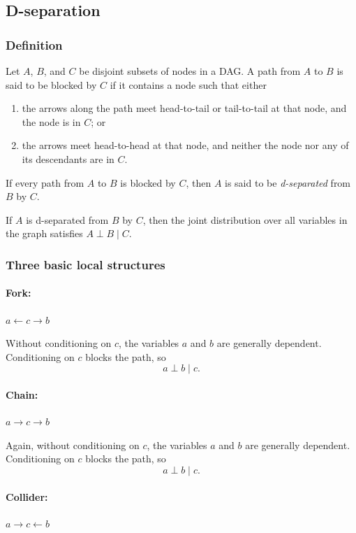 \documentclass[11pt, titlepage]{article} %
\numberwithin{equation}{section}
\theoremstyle{definition}
\numberwithin{assumption}{section}
\begin{document}
\subsection{D-separation}

\subsubsection*{Definition}

Let $A$, $B$, and $C$ be disjoint subsets of nodes in a DAG. A path from $A$ to $B$ is said to be blocked by $C$ if it contains a node such that either

\begin{enumerate}
    \item the arrows along the path meet head-to-tail or tail-to-tail at that node, and the node is in $C$; or
    \item the arrows meet head-to-head at that node, and neither the node nor any of its descendants are in $C$.
\end{enumerate}

If every path from $A$ to $B$ is blocked by $C$, then $A$ is said to be \textit{d-separated} from $B$ by $C$.

If $A$ is d-separated from $B$ by $C$, then the joint distribution over all variables in the graph satisfies
$
A \perp B \mid C.
$

\subsubsection*{Three basic local structures}

\paragraph{Fork:} \(a \leftarrow c \rightarrow b\)

Without conditioning on $c$, the variables $a$ and $b$ are generally dependent. Conditioning on $c$ blocks the path, so
$$
a \perp b \mid c.
$$

\paragraph{Chain:} \(a \rightarrow c \rightarrow b\)

Again, without conditioning on $c$, the variables $a$ and $b$ are generally dependent. Conditioning on $c$ blocks the path, so
$$
a \perp b \mid c.
$$

\paragraph{Collider:} \(a \rightarrow c \leftarrow b\)
\end{document}

